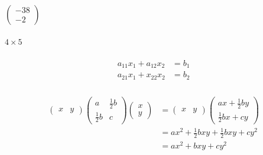 \documentclass{article}
\begin{document}
\subsubsection{}

$\begin{pmatrix}
    -38 \\
    -2
  \end{pmatrix}$

\setcounter{subsubsection}{28}
\subsubsection{}

$4 \times 5$

\setcounter{subsubsection}{40}
\subsubsection{}

\begin{align*}
  a_{11} x_1 + a_{12} x_2 & = b_1 \\
  a_{21} x_1 + x_{22} x_2 & = b_2
\end{align*}

\setcounter{subsubsection}{42}
\subsubsection{}

\begin{align*}
  \begin{pmatrix}
    x & y
  \end{pmatrix} \begin{pmatrix}
                  a             & \frac{1}{2} b \\
                  \frac{1}{2} b & c
                \end{pmatrix} \begin{pmatrix}
                                x \\
                                y
                              \end{pmatrix} & = \begin{pmatrix}
                                                  x & y
                                                \end{pmatrix} \begin{pmatrix}
                                                                a x + \frac{1}{2} b y \\
                                                                \frac{1}{2} b x + c y
                                                              \end{pmatrix}          \\
                                   & = a x^2 + \frac{1}{2} b x y + \frac{1}{2} b x y + c y^2 \\
                                   & = a x^2 + b x y + c y^2
\end{align*}
\end{document}

